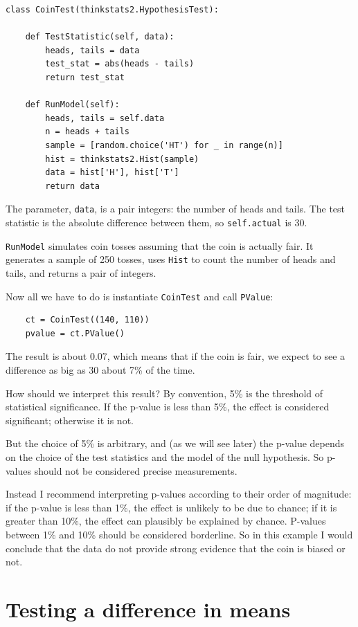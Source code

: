 \documentclass[12pt]{book}
\begin{document}
\begin{verbatim}
class CoinTest(thinkstats2.HypothesisTest):

    def TestStatistic(self, data):
        heads, tails = data
        test_stat = abs(heads - tails)
        return test_stat

    def RunModel(self):
        heads, tails = self.data
        n = heads + tails
        sample = [random.choice('HT') for _ in range(n)]
        hist = thinkstats2.Hist(sample)
        data = hist['H'], hist['T']
        return data
\end{verbatim}

The parameter, {\tt data}, is a pair
integers: the number of heads and tails.  The test statistic is
the absolute difference between them, so {\tt self.actual}
is 30.

{\tt RunModel} simulates coin tosses assuming that the coin is
actually fair.  It generates a sample of 250 tosses, uses {\tt Hist}
to count the number of heads and tails, and returns a pair of
integers.

Now all we have to do is instantiate {\tt CoinTest} and call
{\tt PValue}:

\begin{verbatim}
    ct = CoinTest((140, 110))
    pvalue = ct.PValue()
\end{verbatim}

The result is about 0.07, which means that if the coin is
fair, we expect to see a difference as big as 30 about 7\% of the
time.

How should we interpret this result?  By convention,
5\% is the threshold of statistical significance.  If the
p-value is less than 5\%, the effect is considered significant; otherwise
it is not.

But the choice of 5\% is arbitrary, and (as we will see later) the
p-value depends on the choice of the test statistics and
the model of the null hypothesis.  So p-values should not be considered
precise measurements.

Instead I recommend interpreting p-values according to their order of
magnitude: if the p-value is less than 1\%, the effect is unlikely to
be due to chance; if it is greater than 10\%, the effect can plausibly
be explained by chance.  P-values between 1\% and 10\% should be
considered borderline.  So in this example I would conclude that the
data do not provide strong evidence that the coin is biased or not.


\section{Testing a difference in means}
\label{testdiff}
\end{document}
